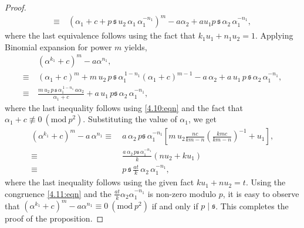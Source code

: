 \documentclass[table]{amsart}
\newcommand{\Mod}[1]{\ (\mathrm{mod}\ #1)} %
\newcommand{\sfrak}{\mathfrak{s}}
\renewcommand{\a}{\alpha}
\numberwithin{equation}{section}
\begin{document}
\begin{proof}
\begin{align*}
        \equiv~ &(\a_1+c + p\, \sfrak \,u_2\, \a_1\, \a_1^{-n_1})^m - a \a_2 + au_1p\,\sfrak \,\a_2 \,\a_1^{-n_1}, 
    \end{align*}
    where the last equivalence follows using the fact that $k_1 u_1 + n_1 u_2 = 1$. Applying Binomial expansion for power $m$ yields,
    \begin{align*}
        &(\a^{k_1} + c)^m - a \a^{n_1}, \\
        \equiv~ &(\a_1+c)^m + m\,u_2 \,p\, \sfrak \,\a_1^{\,1-n_1} (\a_1+c)^{m-1} - a \,\a_2 + a\,u_1\,p\,\sfrak\, \a_2 \,\a_1^{-n_1}, \\
        \equiv~ &\frac{m\,u_2\, p \,\sfrak \,\a_1^{\,1-n_1}\, a \a_2}{\a_1 + c} + a\,u_1\,p\sfrak \,\a_2\, \a_1^{-n_1},
    \end{align*}
    where the last inequality follows using \eqref{4.10:eqn} and the fact that $\a_1+c \not\equiv 0 \Mod{p^2}$. Substituting the value of $\a_1$, we get
    \begin{align}
        (\a^{k_1} + c)^m - a\, \a^{n_1}
        \equiv~ &a\,\a_2\, p \sfrak \,\a_1^{-n_1} \left[ m\,u_2 \frac{nc}{km-n} \left( \frac{kmc}{km-n} \right)^{-1} + u_1 \right], \nonumber \\
        \equiv~ &\frac{a\,\a_2 \,p \sfrak\, \a_1^{-n_1}}{k} (nu_2 + k u_1)\, \nonumber \\
        \equiv~ &p\,\sfrak\, \frac{at}{k}\, \a_2\, \a_1^{-n_1}, \label{4.11:eqn}
    \end{align}
    where the last inequality follows using the given fact $ku_1 + nu_2 = t$. Using the congruence \eqref{4.11:eqn} and the $\frac{at}{k} \a_2 \a_1^{-n_1}$ is non-zero modulo $p$, it is easy to observe that $(\a^{k_1} + c)^m - a \a^{n_1} \equiv 0 \Mod{p^2}$ if and only if $p \mid \sfrak$. This completes the proof of the proposition.
\end{proof}
\end{document}
